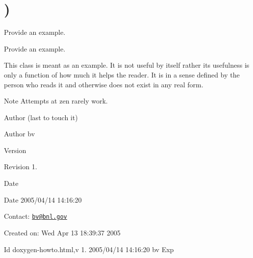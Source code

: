 \hypertarget{group__somewhere}{\section{)}
\label{group__somewhere}
}


Provide an example.  


Provide an example. 

This class is meant as an example. It is not useful by itself rather its usefulness is only a function of how much it helps the reader. It is in a sense defined by the person who reads it and otherwise does not exist in any real form.

\begin{DoxyNote}{Note}
Attempts at zen rarely work.
\end{DoxyNote}
\begin{DoxyAuthor}{Author}
(last to touch it) 
\end{DoxyAuthor}
\begin{DoxyParagraph}{Author}
bv 
\end{DoxyParagraph}


\begin{DoxyVersion}{Version}

\end{DoxyVersion}
\begin{DoxyParagraph}{Revision}
1. 
\end{DoxyParagraph}


\begin{DoxyDate}{Date}

\end{DoxyDate}
\begin{DoxyParagraph}{Date}
2005/04/14 14\+:16\+:20 
\end{DoxyParagraph}


Contact\+: \href{mailto:bv@bnl.gov}{\tt bv@bnl.\+gov}

Created on\+: Wed Apr 13 18\+:39\+:37 2005

\begin{DoxyParagraph}{Id}
doxygen-\/howto.\+html,v 1. 2005/04/14 14\+:16\+:20 bv Exp 
\end{DoxyParagraph}
